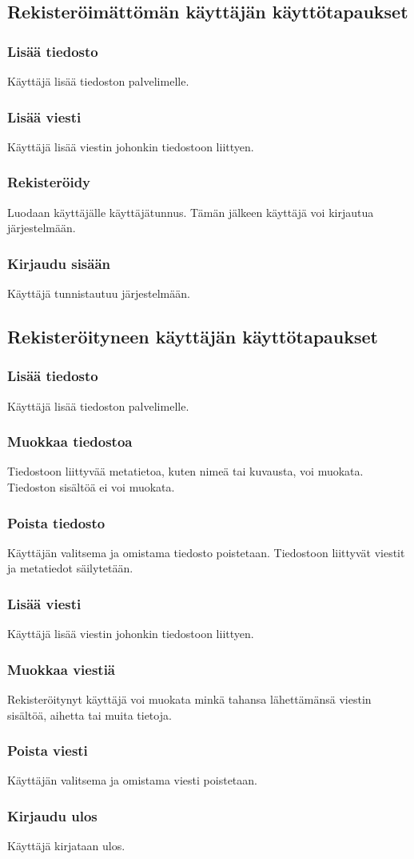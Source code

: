 \documentclass[10pt,a4paper]{article}
\begin{document}
\subsection{Rekisteröimättömän käyttäjän käyttötapaukset}
\subsubsection{Lisää tiedosto}
Käyttäjä lisää tiedoston palvelimelle.
\subsubsection{Lisää viesti}
Käyttäjä lisää viestin johonkin tiedostoon liittyen.

\subsubsection{Rekisteröidy}
Luodaan käyttäjälle käyttäjätunnus. Tämän jälkeen käyttäjä voi kirjautua järjestelmään.
\subsubsection{Kirjaudu sisään}
Käyttäjä tunnistautuu järjestelmään.


\subsection{Rekisteröityneen käyttäjän käyttötapaukset}
\subsubsection{Lisää tiedosto}
Käyttäjä lisää tiedoston palvelimelle.
\subsubsection{Muokkaa tiedostoa}
Tiedostoon liittyvää metatietoa, kuten nimeä tai kuvausta, voi muokata. Tiedoston sisältöä ei voi muokata.
\subsubsection{Poista tiedosto}
Käyttäjän valitsema ja omistama tiedosto poistetaan. Tiedostoon liittyvät viestit ja metatiedot säilytetään.

\subsubsection{Lisää viesti}
Käyttäjä lisää viestin johonkin tiedostoon liittyen.
\subsubsection{Muokkaa viestiä}
Rekisteröitynyt käyttäjä voi muokata minkä tahansa lähettämänsä viestin sisältöä, aihetta tai muita tietoja.
\subsubsection{Poista viesti}
Käyttäjän valitsema ja omistama viesti poistetaan.

\subsubsection{Kirjaudu ulos}
Käyttäjä kirjataan ulos.
\end{document}
